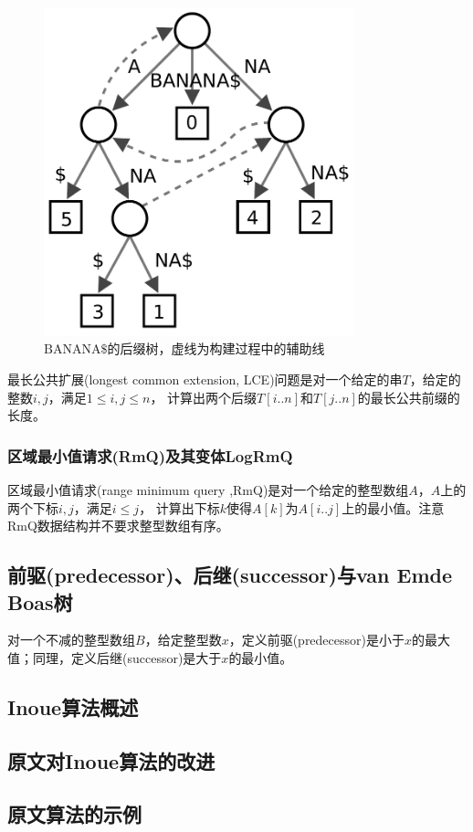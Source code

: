 \begin{figure}[h]
    \centering
    \includegraphics[width=0.8\textwidth]{resources/fig/Suffix_tree_BANANA}
    \caption{$\mathrm{BANANA\$}$的后缀树，虚线为构建过程中的辅助线}\label{fig:suffix}
\end{figure}

最长公共扩展(longest common extension, LCE)问题是对一个给定的串$T$，给定的整数$i,j$，满足$1 \leq i,j \leq n$，
计算出两个后缀$T[i..n]$和$T[j..n]$的最长公共前缀的长度。

\subsubsection{区域最小值请求(RmQ)及其变体LogRmQ}\label{subsubsec:rmq}

区域最小值请求(range minimum query ,RmQ)是对一个给定的整型数组$A$，$A$上的两个下标$i,j$，满足$i \leq j$，
计算出下标$k$使得$A[k]$为$A[i..j]$上的最小值。注意RmQ数据结构并不要求整型数组有序。

\subsection{前驱(predecessor)、后继(successor)与van Emde Boas树}\label{subsec:van}

对一个不减的整型数组$B$，给定整型数$x$，定义前驱(predecessor)是小于$x$的最大值；同理，定义后继(successor)是大于$x$的最小值。

\subsection{Inoue算法概述}\label{subsec:inoue}

\subsection{原文对Inoue算法的改进}\label{subsec:progress}

\subsection{原文算法的示例}\label{subsec:example}
